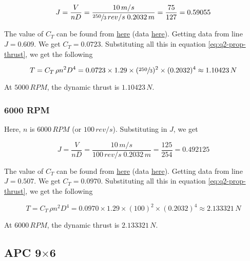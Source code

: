 \begin{equation*}
    J = \frac{V}{nD} = \frac{10\,m/s}{\sfrac{250}{3}\,rev/s \; 0.2032\,m} = \frac{75}{127} = 0.59055
\end{equation*}

The value of $C_T$ can be found from \href{https://m-selig.ae.illinois.edu/props/volume-1/plots/apcsf_8x6_ct.png}{here} (data \href{https://m-selig.ae.illinois.edu/props/volume-1/data/apcsf_8x6_2786rd_5004.txt}{here}). Getting data from line $J=0.609$. We get $C_T = 0.0723$. Substituting all this in equation \ref{eq:q2-prop-thrust}, we get the following

\begin{equation*}
    T = C_T \, \rho n^2 D^4 = 0.0723 \times 1.29 \times (\sfrac{250}{3})^2 \times (0.2032)^4 \approx 1.10423\,N
\end{equation*}

At $5000\,RPM$, the dynamic thrust is $1.10423\,N$.

\subsubsection*{6000 RPM}

Here, $n$ is $6000\,RPM$ (or $100\,rev/s$). Substituting in $J$, we get

\begin{equation*}
    J = \frac{V}{nD} = \frac{10\,m/s}{100\,rev/s \; 0.2032\,m} = \frac{125}{254} = 0.492125
\end{equation*}

The value of $C_T$ can be found from \href{https://m-selig.ae.illinois.edu/props/volume-1/plots/apcsf_8x6_ct.png}{here} (data \href{https://m-selig.ae.illinois.edu/props/volume-1/data/apcsf_8x6_2788rd_6009.txt}{here}). Getting data from line $J = 0.507$. We get $C_T = 0.0970$. Substituting all this in equation \ref{eq:q2-prop-thrust}, we get the following

\begin{equation*}
    T = C_T \, \rho n^2 D^4 = 0.0970 \times 1.29 \times (100)^2 \times (0.2032)^4 \approx 2.133321\,N
\end{equation*}

At $6000\,RPM$, the dynamic thrust is $2.133321\,N$.

\subsection{APC 9\texorpdfstring{$\times$}{by}6}

